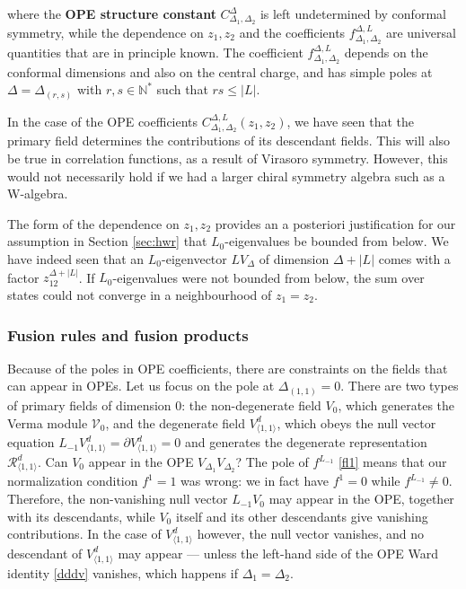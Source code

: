 \documentclass[12pt, a4paper]{article}
\newcommand{\myindex}[1]{\textbf{\boldmath #1}}
\theoremstyle{break}
\begin{document}
where the \myindex{OPE structure constant} $C^\Delta_{\Delta_1,\Delta_2}$ is left undetermined by conformal symmetry, while the dependence on $z_1,z_2$ and the coefficients $f^{\Delta,L}_{\Delta_1,\Delta_2}$ are universal quantities that are in principle known. The coefficient $f^{\Delta,L}_{\Delta_1,\Delta_2}$ depends on the conformal dimensions and also on the central charge, and has simple poles at $\Delta=\Delta_{(r,s)}$ with $r,s\in\mathbb{N}^*$ such that $rs\leq |L|$. 

In the case of the OPE coefficients $C^{\Delta,L}_{\Delta_1,\Delta_2}(z_1,z_2)$, we have seen that the primary field determines the contributions of its descendant fields. This will also be true in correlation functions, as a result of Virasoro symmetry. However, this would not necessarily hold if we had a larger chiral symmetry algebra such as a W-algebra. 

The form of the dependence on $z_1,z_2$ provides an a posteriori justification for our assumption in Section \ref{sec:hwr} that $L_0$-eigenvalues be bounded from below. We have indeed seen that an $L_0$-eigenvector $LV_\Delta$ of dimension $\Delta+|L|$ comes with a factor $z_{12}^{\Delta+|L|}$. If $L_0$-eigenvalues were not bounded from below, the sum over states could not converge in a neighbourhood of $z_1=z_2$. 


\subsubsection{Fusion rules and fusion products}\label{sec:dope}

Because of the poles in OPE coefficients, there are constraints on the fields that can appear in OPEs. Let us focus on the pole at $\Delta_{(1,1)}=0$. There are two types of primary fields of dimension $0$: the non-degenerate field $V_0$, which generates the Verma module $\mathcal{V}_0$, and the degenerate field $V^d_{\langle 1,1\rangle}$, which obeys the null vector equation $L_{-1}V^d_{\langle 1,1\rangle}=\partial V^d_{\langle 1,1\rangle}=0$ and generates the degenerate representation $\mathcal{R}^d_{\langle 1,1\rangle}$. Can $V_0$ appear in the OPE $V_{\Delta_1}V_{\Delta_2}$? The pole of $f^{L_{-1}}$ \eqref{fl1} means that our normalization condition $f^1=1$ was wrong: we in fact have $f^1=0$ while $f^{L_{-1}}\neq 0$. Therefore, the non-vanishing null vector $L_{-1}V_0$ may appear in the OPE, together with its descendants, while $V_0$ itself and its other descendants give vanishing contributions. In the case of $V^d_{\langle 1,1\rangle}$ however, the null vector vanishes, and no descendant of $V^d_{\langle 1,1\rangle}$ may appear --- unless the left-hand side of the OPE Ward identity \eqref{dddv} vanishes, which happens if $\Delta_1=\Delta_2$. 
\end{document}
